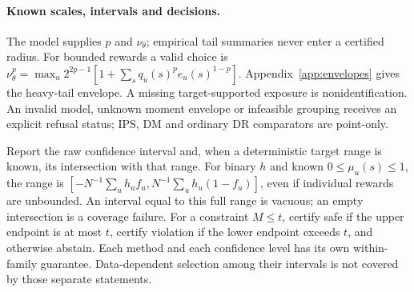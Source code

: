 \paragraph{Known scales, intervals and decisions.}
The model supplies $p$ and $\nu_\theta$; empirical tail summaries never enter a certified radius. For bounded rewards a valid choice is
$\nu_\theta^p=\max_u2^{2p-1}[1+\sum_s q_u(s)^p e_u(s)^{1-p}]$.
Appendix~\ref{app:envelopes} gives the heavy-tail envelope. A missing target-supported exposure is nonidentification. An invalid model, unknown moment envelope or infeasible grouping receives an explicit refusal status; IPS, DM and ordinary DR comparators are point-only.

Report the raw confidence interval and, when a deterministic target range is known, its intersection with that range. For binary $h$ and known $0\le\mu_u(s)\le1$, the range is $[-N^{-1}\sum_uh_uf_u,N^{-1}\sum_uh_u(1-f_u)]$, even if individual rewards are unbounded. An interval equal to this full range is vacuous; an empty intersection is a coverage failure. For a constraint $M\le t$, certify safe if the upper endpoint is at most $t$, certify violation if the lower endpoint exceeds $t$, and otherwise abstain. Each method and each confidence level has its own within-family guarantee. Data-dependent selection among their intervals is not covered by those separate statements.
